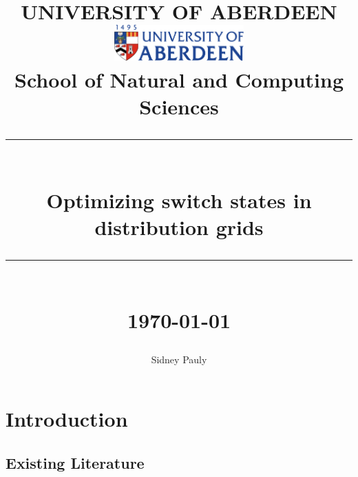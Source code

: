 \documentclass[a4paper]{report}
\author{Sidney Pauly}
\newcommand{\HRule}[1]{\rule{\linewidth}{#1}}
\begin{document}

\title{ UNIVERSITY OF ABERDEEN
		\\ [1.0cm]
		\includegraphics[width=50mm]{img/ABDN.png}\\[.5cm]
		School of Natural and Computing Sciences\\
		\HRule{2pt} \\
		\LARGE \textbf{Optimizing switch states in distribution grids}
		\HRule{2pt} \\ [0.5cm]
		\normalsize \today\vspace*{5\baselineskip}}%
		
\maketitle

\tableofcontents

\clearpage

\chapter{Introduction}




\section{Existing Literature}


\end{document}
